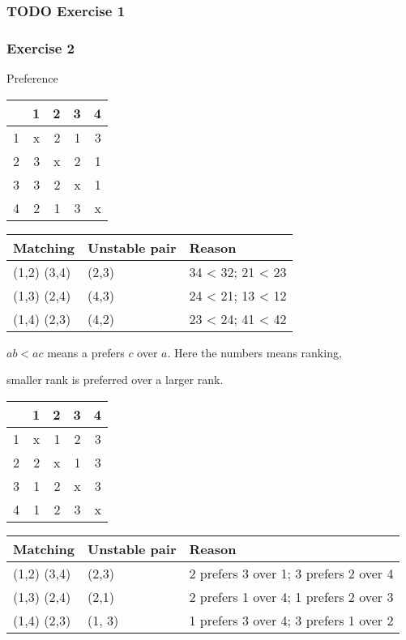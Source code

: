 \documentclass[11pt]{article}
\begin{document}
\subsubsection{{\bfseries\sffamily TODO} Exercise 1}
\label{sec:org14d7bac}
\subsubsection{Exercise 2}
\label{sec:org2ee21d8}
Preference

\begin{center}
\begin{tabular}{rrrrr}
 & 1 & 2 & 3 & 4\\
\hline
1 & x & 2 & 1 & 3\\
2 & 3 & x & 2 & 1\\
3 & 3 & 2 & x & 1\\
4 & 2 & 1 & 3 & x\\
\end{tabular}
\end{center}

\begin{center}
\begin{tabular}{lll}
Matching & Unstable pair & Reason\\
\hline
(1,2) (3,4) & (2,3) & 34 < 32; 21 < 23\\
(1,3) (2,4) & (4,3) & 24 < 21; 13 < 12\\
(1,4) (2,3) & (4,2) & 23 < 24; 41 < 42\\
\end{tabular}
\end{center}


\(ab < ac\) means a prefers \(c\) over \(a\). Here the numbers means ranking,

smaller rank is preferred over a larger rank.

\begin{center}
\begin{tabular}{rrrrr}
 & 1 & 2 & 3 & 4\\
\hline
1 & x & 1 & 2 & 3\\
2 & 2 & x & 1 & 3\\
3 & 1 & 2 & x & 3\\
4 & 1 & 2 & 3 & x\\
\end{tabular}
\end{center}

\begin{center}
\begin{tabular}{lll}
Matching & Unstable pair & Reason\\
\hline
(1,2) (3,4) & (2,3) & 2 prefers 3 over 1; 3 prefers 2 over 4\\
(1,3) (2,4) & (2,1) & 2 prefers 1 over 4; 1 prefers 2 over 3\\
(1,4) (2,3) & (1, 3) & 1 prefers 3 over 4; 3 prefers 1 over 2\\
\end{tabular}
\end{center}
\end{document}
